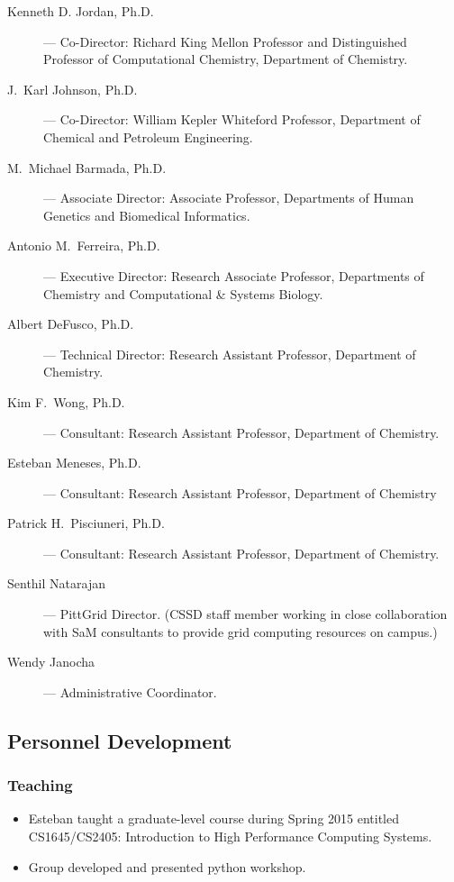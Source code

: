 \begin{description}

    \item [Kenneth D. Jordan, Ph.D.] --- Co-Director: Richard King Mellon
	  Professor and Distinguished Professor of Computational Chemistry,
          Department of Chemistry.

    \item [J.\ Karl Johnson, Ph.D.] --- Co-Director: William Kepler Whiteford
          Professor, Department of Chemical and Petroleum Engineering.

    \item [M.\ Michael Barmada, Ph.D.] --- Associate Director: Associate
	  Professor, Departments of Human Genetics and Biomedical Informatics.

    \item [Antonio M.\ Ferreira, Ph.D.] --- Executive Director: Research
          Associate Professor, Departments of Chemistry and Computational \& Systems Biology.

    \item [Albert DeFusco, Ph.D.] --- Technical Director: Research
          Assistant Professor, Department of Chemistry.

    \item [Kim F.\ Wong, Ph.D.] --- Consultant: Research Assistant
          Professor, Department of Chemistry.

    \item [Esteban Meneses, Ph.D.] --- Consultant: Research Assistant
          Professor, Department of Chemistry

    \item [Patrick H.\ Pisciuneri, Ph.D.] --- Consultant: Research Assistant Professor, Department of Chemistry.

    \item [Senthil Natarajan] --- PittGrid Director. (CSSD staff
          member working in close collaboration with SaM consultants to
          provide grid computing resources on campus.)

    \item [Wendy Janocha] --- Administrative Coordinator.

\end{description}


\subsection{Personnel Development}
\subsubsection{Teaching}
\begin{itemize}
    \item Esteban taught a graduate-level course during Spring 2015 entitled CS1645/CS2405: Introduction to High Performance Computing Systems.

    \item Group developed and presented python workshop.
\end{itemize}



